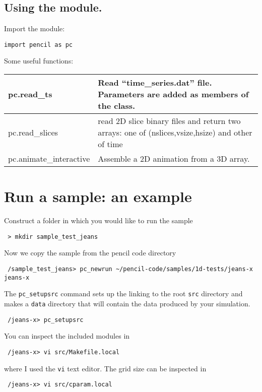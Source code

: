 \documentclass[a4paper,12pt]{article}
\begin{document}
\subsection{Using the module.}
Import the module:
\begin{verbatim}
import pencil as pc
\end{verbatim}
Some useful functions:
\begin{center}
\begin{tabular}{|l|l|}\hline
pc.read\_ts & Read ``time\_series.dat'' file. Parameters are added as members of the class. \\\hline
pc.read\_slices & read 2D slice binary files and return two arrays: one of (nslices,vsize,hsize) and other of time\\\hline
pc.animate\_interactive &  Assemble a 2D animation from a 3D array. \\\hline
\end{tabular}
\end{center}

\section{Run a sample: an example}

Construct a folder in which you would like to run the sample
\begin{verbatim}
 > mkdir sample_test_jeans
\end{verbatim}

Now we copy the sample from the pencil code directory
\begin{verbatim}
 /sample_test_jeans> pc_newrun ~/pencil-code/samples/1d-tests/jeans-x jeans-x
\end{verbatim}

The \verb|pc_setupsrc| command sets up the linking to the root \verb|src|
directory and makes a \verb|data| directory that will contain the data produced
by your simulation.
\begin{verbatim}
 /jeans-x> pc_setupsrc
\end{verbatim}

You can inspect the included modules in
\begin{verbatim}
 /jeans-x> vi src/Makefile.local 
\end{verbatim}
where I used the \verb|vi| text editor. The grid size can be inspected in 
\begin{verbatim}
 /jeans-x> vi src/cparam.local 
\end{verbatim}
\end{document}
